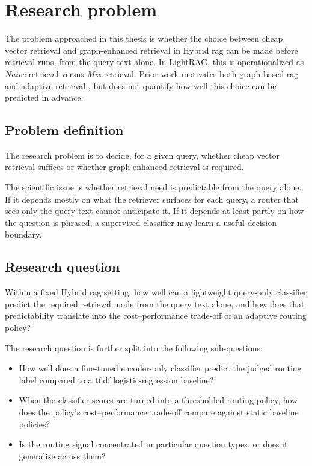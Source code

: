 \documentclass[english, bibtex]{kththesis}               %
\numberwithin{listing}{chapter}
\begin{document}
\section{Research problem}
\label{sec:problem}

The problem approached in this thesis is whether the choice between cheap vector retrieval and graph-enhanced retrieval in Hybrid \gls{rag} can be made before retrieval runs, from the query text alone. In LightRAG, this is operationalized as \emph{Naive} retrieval versus \emph{Mix} retrieval. Prior work motivates both graph-based \gls{rag} and adaptive retrieval \cite{edge2024graphrag,lightrag2024,asai2023selfrag,jeong2024adaptiverag}, but does not quantify how well this choice can be predicted in advance.

\subsection{Problem definition}
\label{sec:problemDefinition}

The research problem is to decide, for a given query, whether cheap vector retrieval suffices or whether graph-enhanced retrieval is required.

The scientific issue is whether retrieval need is predictable from the query alone. If it depends mostly on what the retriever surfaces for each query, a router that sees only the query text cannot anticipate it. If it depends at least partly on how the question is phrased, a supervised classifier may learn a useful decision boundary.

\subsection{Research question}
\label{sec:researchQuestion}

Within a fixed Hybrid \gls{rag} setting, how well can a lightweight query-only classifier predict the required retrieval mode from the query text alone, and how does that predictability translate into the cost--performance trade-off of an adaptive routing policy?

The research question is further split into the following sub-questions:

\begin{itemize}
    \item How well does a fine-tuned encoder-only classifier predict the judged routing label compared to a \gls{tfidf} logistic-regression baseline?
    \item When the classifier scores are turned into a thresholded routing policy, how does the policy's cost--performance trade-off compare against static baseline policies?
    \item Is the routing signal concentrated in particular question types, or does it generalize across them?
\end{itemize}
\end{document}
